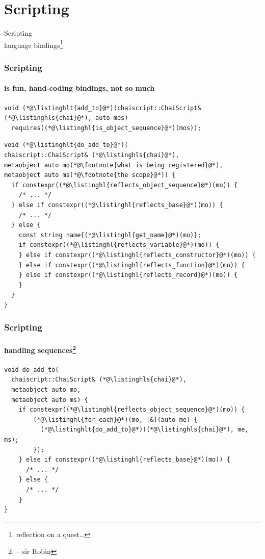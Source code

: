 \documentclass[compress,table,xcolor=table]{beamer}
\begin{document}
\section{Scripting}
\begin{frame}[c]
  \Huge
  \centering
  Scripting\\
  \Large
  language bindings\footnote{reflection on a quest\ldots}
  
\end{frame}
\begin{frame}[fragile]
  \frametitle{Scripting}
  \framesubtitle{is fun, hand-coding bindings, not so much}
  \begin{lstlisting}[language=c++2x,basicstyle=\footnotesize\ttfamily]
void (*@\listinghlt{add_to}@*)(chaiscript::ChaiScript& (*@\listinghls{chai}@*), auto mos)
  requires((*@\listinghl{is_object_sequence}@*)(mos));
  \end{lstlisting}
  \begin{lstlisting}[language=c++2x,basicstyle=\scriptsize\ttfamily]
void (*@\listinghlt{do_add_to}@*)(
chaiscript::ChaiScript& (*@\listinghls{chai}@*),
metaobject auto mo(*@\footnote{what is being registered}@*),
metaobject auto ms(*@\footnote{the scope}@*)) {
  if constexpr((*@\listinghl{reflects_object_sequence}@*)(mo)) {
    /* ... */
  } else if constexpr((*@\listinghl{reflects_base}@*)(mo)) {
    /* ... */
  } else {
    const string name{(*@\listinghl{get_name}@*)(mo)};
    if constexpr((*@\listinghl{reflects_variable}@*)(mo)) {
    } else if constexpr((*@\listinghl{reflects_constructor}@*)(mo)) {
    } else if constexpr((*@\listinghl{reflects_function}@*)(mo)) {
    } else if constexpr((*@\listinghl{reflects_record}@*)(mo)) {
    }
  }
}
  \end{lstlisting}
\end{frame}
\begin{frame}[fragile]
  \frametitle{Scripting}
  \framesubtitle{handling sequences\footnote{ -- sir Robin}}
  \begin{lstlisting}[language=c++2x,basicstyle=\small\ttfamily]
void do_add_to(
  chaiscript::ChaiScript& (*@\listinghls{chai}@*),
  metaobject auto mo,
  metaobject auto ms) {
    if constexpr((*@\listinghl{reflects_object_sequence}@*)(mo)) {
        (*@\listinghl{for_each}@*)(mo, [&](auto me) {
          (*@\listinghlt{do_add_to}@*)((*@\listinghls{chai}@*), me, ms);
        });
    } else if constexpr((*@\listinghl{reflects_base}@*)(mo)) {
      /* ... */
    } else {
      /* ... */
    }
}
  \end{lstlisting}
\end{frame}
\end{document}
